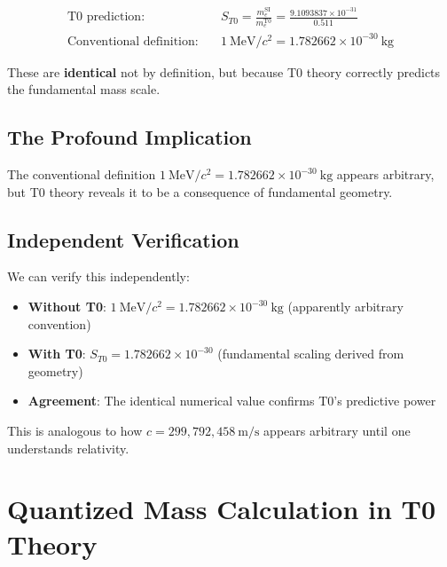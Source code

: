 	\begin{align}
		\text{T0 prediction:} \quad & S_{T0} = \frac{m_e^{\mathrm{SI}}}{m_e^{\mathrm{T0}}} = \frac{9.1093837 \times 10^{-31}}{0.511} \\
		\text{Conventional definition:} \quad & 1~\mathrm{MeV}/c^2 = 1.782662 \times 10^{-30}~\mathrm{kg}
	\end{align}
	
	These are \textbf{identical} not by definition, but because T0 theory correctly predicts the fundamental mass scale.
	
	\subsection{The Profound Implication}
	
	\begin{center}
	\end{center}
	
	The conventional definition $1~\mathrm{MeV}/c^2 = 1.782662 \times 10^{-30}~\mathrm{kg}$ appears arbitrary, but T0 theory reveals it to be a consequence of fundamental geometry.
	
	\subsection{Independent Verification}
	
	We can verify this independently:
	
	\begin{itemize}
		\item \textbf{Without T0}: $1~\mathrm{MeV}/c^2 = 1.782662\times 10^{-30}~\mathrm{kg}$ (apparently arbitrary convention)
		\item \textbf{With T0}: $S_{T0} = 1.782662\times 10^{-30}$ (fundamental scaling derived from geometry)
		\item \textbf{Agreement}: The identical numerical value confirms T0's predictive power
	\end{itemize}
	
	This is analogous to how $c = 299,792,458~\mathrm{m/s}$ appears arbitrary until one understands relativity.
	
	\section{Quantized Mass Calculation in T0 Theory}
	
